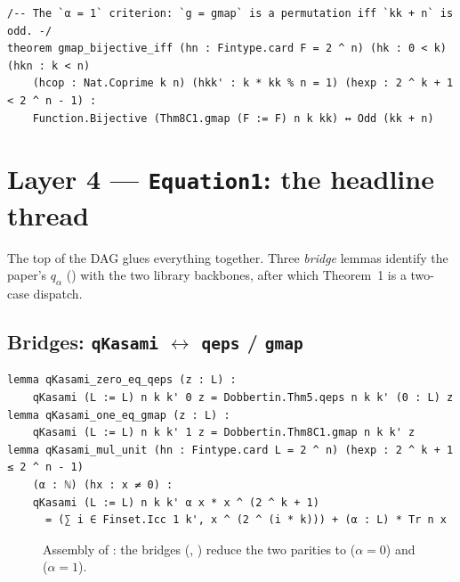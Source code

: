 \documentclass[11pt]{article}
\theoremstyle{definition}
\begin{document}
\begin{lstlisting}
/-- The `α = 1` criterion: `g = gmap` is a permutation iff `kk + n` is odd. -/
theorem gmap_bijective_iff (hn : Fintype.card F = 2 ^ n) (hk : 0 < k) (hkn : k < n)
    (hcop : Nat.Coprime k n) (hkk' : k * kk % n = 1) (hexp : 2 ^ k + 1 < 2 ^ n - 1) :
    Function.Bijective (Thm8C1.gmap (F := F) n k kk) ↔ Odd (kk + n)
\end{lstlisting}

\section{Layer 4 --- \texttt{Equation1}: the headline thread}

The top of the DAG glues everything together.  Three \emph{bridge} lemmas
identify the paper's $q_\alpha$ () with the two library backbones,
after which Theorem~1 is a two-case dispatch.

\subsection{Bridges: \texttt{qKasami} $\leftrightarrow$ \texttt{qeps} / \texttt{gmap}}

\begin{lstlisting}
lemma qKasami_zero_eq_qeps (z : L) :
    qKasami (L := L) n k k' 0 z = Dobbertin.Thm5.qeps n k k' (0 : L) z
lemma qKasami_one_eq_gmap (z : L) :
    qKasami (L := L) n k k' 1 z = Dobbertin.Thm8C1.gmap n k k' z
lemma qKasami_mul_unit (hn : Fintype.card L = 2 ^ n) (hexp : 2 ^ k + 1 ≤ 2 ^ n - 1)
    (α : ℕ) (hx : x ≠ 0) :
    qKasami (L := L) n k k' α x * x ^ (2 ^ k + 1)
      = (∑ i ∈ Finset.Icc 1 k', x ^ (2 ^ (i * k))) + (α : L) * Tr n x
\end{lstlisting}

\begin{figure}[h]
\centering
{\footnotesize
{}
}
\caption{Assembly of : the bridges (,
) reduce the two parities to  ($\alpha=0$)
and  ($\alpha=1$).}
\end{figure}
\end{document}
